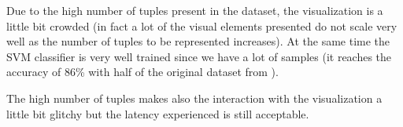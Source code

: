 \documentclass[journal]{vgtc}                %
\begin{document}
Due to the high number of tuples present in the dataset, the visualization is a little bit crowded (in fact a lot of the visual elements presented do not scale very well as the number of tuples to be represented increases). At the same time the SVM classifier is
very well trained since we have a lot of samples (it reaches the accuracy of 86\% with half of the original dataset from \cite{UCI:2016}).

The high number of tuples makes also the interaction with the visualization a little bit glitchy but the latency experienced is still acceptable.




\end{document}
